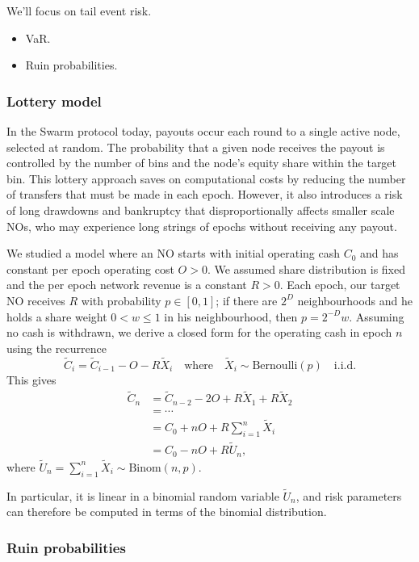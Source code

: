 We'll focus on tail event risk.
\begin{itemize}

  \item VaR.
  \item Ruin probabilities.

\end{itemize}

\subsubsection{Lottery model}

In the Swarm protocol today, payouts occur each round to a single active node, selected at random.
%
The probability that a given node receives the payout is controlled by the number of bins and the node's equity share within the target bin.
%
This lottery approach saves on computational costs by reducing the number of transfers that must be made in each epoch.
%
However, it also introduces a risk of long drawdowns and bankruptcy that disproportionally affects smaller scale NOs, who may experience long strings of epochs without receiving any payout.

We studied a model where an NO starts with initial operating cash $C_0$ and has constant per epoch operating cost $O>0$.
%
We assumed share distribution is fixed and the per epoch network revenue is a constant $R>0$.
%
Each epoch, our target NO receives $R$ with probability $p\in[0,1]$; if there are $2^D$ neighbourhoods and he holds a share weight $0<w\leq 1$ in his neighbourhood, then $p=2^{-D}w$.
%
Assuming no cash is withdrawn, we derive a closed form for the operating cash in epoch $n$ using the recurrence
%
\[
  \tilde{C}_i = \tilde C_{i-1} - O - R\tilde{X}_i \quad \text{where} \quad \tilde{X}_i \sim \mathrm{Bernoulli}(p) \quad \text{i.i.d.}
\]
This gives 
\begin{align*}
  \tilde C_n &= \tilde C_{n-2} - 2O + R\tilde X_1 + R\tilde X_2 \\
  & =\cdots \\
  &= C_0 + nO + R\sum_{i=1}^n \tilde X_i \\
  &= C_0 - nO + R\tilde U_n,
\end{align*}
where $\tilde U_n = \sum_{i=1}^n \tilde X_i \sim \mathrm{Binom}(n,p)$.

In particular, it is linear in a binomial random variable $\tilde U_n$, and risk parameters can therefore be computed in terms of the binomial distribution.

\subsubsection{Ruin probabilities}


